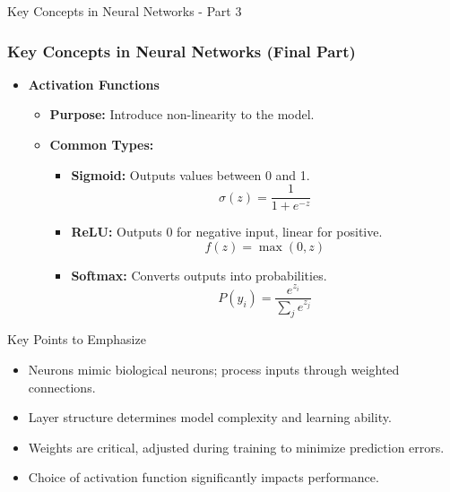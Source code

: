 \documentclass[aspectratio=169]{beamer}
\begin{document}
\begin{frame}[fragile]{Key Concepts in Neural Networks - Part 3}
  \frametitle{Key Concepts in Neural Networks (Final Part)}

  \begin{itemize}
    \item \textbf{Activation Functions}
    \begin{itemize}
      \item \textbf{Purpose:} Introduce non-linearity to the model.
      \item \textbf{Common Types:}
      \begin{itemize}
        \item \textbf{Sigmoid:} Outputs values between 0 and 1.
        \begin{equation}
        \sigma(z) = \frac{1}{1 + e^{-z}}
        \end{equation}
        \item \textbf{ReLU:} Outputs 0 for negative input, linear for positive.
        \begin{equation}
        f(z) = \max(0, z)
        \end{equation}
        \item \textbf{Softmax:} Converts outputs into probabilities.
        \begin{equation}
        P(y_i) = \frac{e^{z_i}}{\sum_{j} e^{z_j}}
        \end{equation}
      \end{itemize}
    \end{itemize}
  \end{itemize}

  \begin{block}{Key Points to Emphasize}
    \begin{itemize}
      \item Neurons mimic biological neurons; process inputs through weighted connections.
      \item Layer structure determines model complexity and learning ability.
      \item Weights are critical, adjusted during training to minimize prediction errors.
      \item Choice of activation function significantly impacts performance.
    \end{itemize}
  \end{block}
\end{frame}
\end{document}
